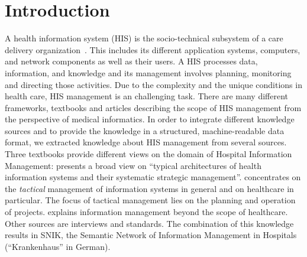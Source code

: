 \documentclass{IOS-Book-Article}     %
\newcommand{\citet}{\cite}%
\newcommand{\citep}{\cite}%
\begin{document}
\section{Introduction}
A health information system (HIS) is the socio-technical subsystem of a care delivery organization~\citep{bb}.
This includes its different application systems, computers, and network components as well as their users.
A HIS processes data, information, and knowledge and its management involves planning, monitoring and directing those activities.
Due to the complexity and the unique conditions in health care, HIS management is an challenging task.
There are many different frameworks, textbooks and articles describing the scope of HIS management from the perspective of medical informatics.
In order to integrate different knowledge sources and to provide the knowledge in a structured, machine-readable data format, we extracted knowledge about HIS management from several sources.%
Three textbooks provide different views on the domain of Hospital Information Management:
\citet{bb} presents a broad view on \enquote{typical architectures of health information systems and their systematic strategic management}.
\citep{ob} concentrates on the \emph{tactical} management of information systems in general and on healthcare in particular.
The focus of tactical management lies on the planning and operation of projects.
\citet{he} explains information management beyond the scope of healthcare.
Other sources are interviews and standards.
%
The combination of this knowledge~\citep{semantischesnetz,domaene,approachtosupport} results in SNIK, the Semantic Network of Information Management in Hospitals (\enquote{Krankenhaus} in German).
\end{document}
